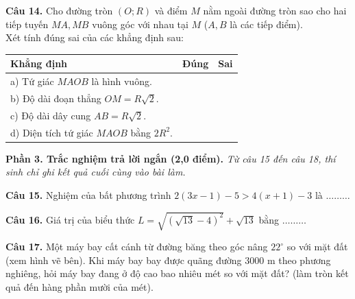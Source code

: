 \documentclass[11pt,a4paper]{article}
\begin{document}
\vspace{2mm}
\textbf{Câu 14.} Cho đường tròn $(O; R)$ và điểm $M$ nằm ngoài đường tròn sao cho hai tiếp tuyến $MA, MB$ vuông góc với nhau tại $M$ ($A, B$ là các tiếp điểm).\\
Xét tính đúng sai của các khẳng định sau:
\begin{center}
\begin{tabularx}{\linewidth}{|X|c|c|}
\hline
\textbf{Khẳng định} & \textbf{Đúng} & \textbf{Sai} \\
\hline
a) Tứ giác $MAOB$ là hình vuông. & & \\
\hline
b) Độ dài đoạn thẳng $OM = R\sqrt{2}$. & & \\
\hline
c) Độ dài dây cung $AB = R\sqrt{2}$. & & \\
\hline
d) Diện tích tứ giác $MAOB$ bằng $2R^2$. & & \\
\hline
\end{tabularx}
\end{center}

\vspace{3mm}
\noindent
\textbf{Phần 3. Trắc nghiệm trả lời ngắn (2,0 điểm).} \textit{Từ câu 15 đến câu 18, thí sinh chỉ ghi kết quả cuối cùng vào bài làm.}

\vspace{1.5mm}
\textbf{Câu 15.} Nghiệm của bất phương trình $2(3x - 1) - 5 > 4(x + 1) - 3$ là $\dots\dots\dots$

\vspace{1.5mm}
\textbf{Câu 16.} Giá trị của biểu thức $L = \sqrt{(\sqrt{13} - 4)^2} + \sqrt{13}$ bằng $\dots\dots\dots$

\vspace{1.5mm}
\noindent
\begin{minipage}[c]{0.65\linewidth}
\textbf{Câu 17.} Một máy bay cất cánh từ đường băng theo góc nâng $22^\circ$ so với mặt đất (xem hình vẽ bên). Khi máy bay bay được quãng đường $3000\text{ m}$ theo phương nghiêng, hỏi máy bay đang ở độ cao bao nhiêu mét so với mặt đất? (làm tròn kết quả đến hàng phần mười của mét).
\end{minipage}\hfill
\begin{minipage}[c]{0.32\linewidth}
\centering
{}
\end{minipage}
\end{document}
